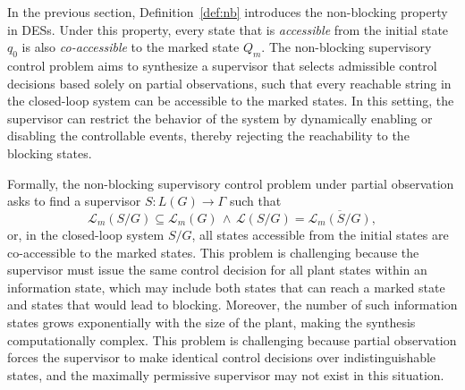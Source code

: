 \documentclass[journal,twoside,web]{ieeecolor}
\begin{document}
In the previous section, Definition~\ref{def:nb} introduces the non-blocking property in DESs.
Under this property, every state that is \emph{accessible} from the initial state $q_0$ is also \emph{co-accessible} to the marked state $Q_m$.
%
The non-blocking supervisory control problem aims to synthesize a supervisor that selects admissible control decisions based solely on partial observations, such that every reachable string in the closed-loop system can be accessible to the marked states. 
In this setting, the supervisor can restrict the behavior of the system by dynamically enabling or disabling the controllable events, thereby rejecting the reachability to the blocking states.

Formally, the non-blocking supervisory control problem under partial observation asks to find a supervisor $S: L(G) \to \Gamma$ such that
\begin{equation}
    \mathcal{L}_m(S / G) \subseteq \mathcal{L}_m(G) \, \wedge \, \mathcal{L}(S / G) = \overline{\mathcal{L}_m(S / G)},
    \label{eq:nb_sc}
\end{equation}
or, in the closed-loop system $S / G$, all states accessible from the initial states are co-accessible to the marked states.
%
This problem is challenging because the supervisor must issue the same control decision for all plant states within an information state, which may include both states that can reach a marked state and states that would lead to blocking. 
Moreover, the number of such information states grows exponentially with the size of the plant, making the synthesis computationally complex.
%
This problem is challenging because partial observation forces the supervisor to make identical control decisions over indistinguishable states, and the maximally permissive supervisor may not exist in this situation.
%
\end{document}
